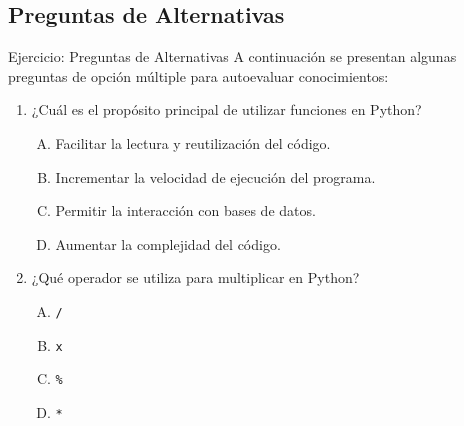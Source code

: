 \documentclass[10pt]{beamer}
\begin{document}
\subsection{Preguntas de Alternativas}
\begin{frame}{Ejercicio: Preguntas de Alternativas}
  A continuación se presentan algunas preguntas de opción múltiple para autoevaluar conocimientos:
  \begin{enumerate}
    \item ¿Cuál es el propósito principal de utilizar funciones en Python?
      \begin{enumerate}[A)]
        \item Facilitar la lectura y reutilización del código.
        \item Incrementar la velocidad de ejecución del programa.
        \item Permitir la interacción con bases de datos.
        \item Aumentar la complejidad del código.
      \end{enumerate}
    \item ¿Qué operador se utiliza para multiplicar en Python?
      \begin{enumerate}[A)]
        \item \texttt{/}
        \item \texttt{x}
        \item \texttt{\%}
        \item \texttt{*}
      \end{enumerate}
  \end{enumerate}
  \vspace{0.3cm}
\end{frame}
\end{document}

